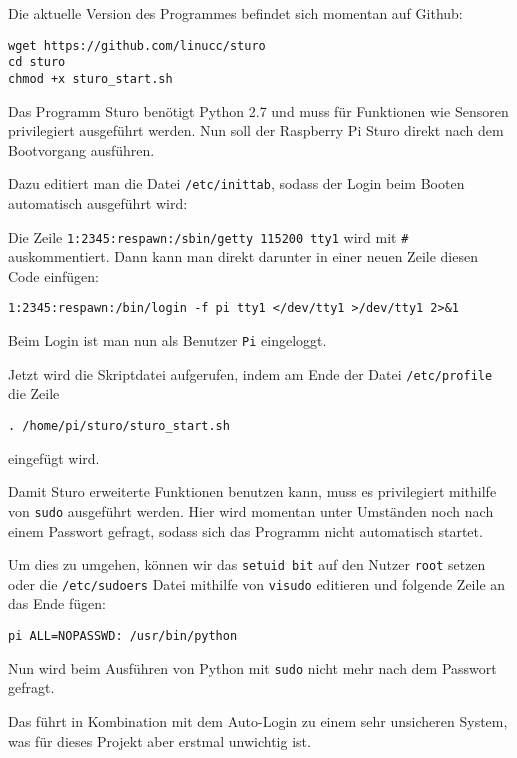 \documentclass[a4paper,10pt]{scrartcl}
\begin{document}
    Die aktuelle Version des Programmes befindet sich momentan auf Github:

    \begin{lstlisting}
wget https://github.com/linucc/sturo
cd sturo
chmod +x sturo_start.sh
    \end{lstlisting}

    Das Programm Sturo benötigt Python 2.7 und muss für Funktionen wie Sensoren privilegiert
    ausgeführt werden.
    Nun soll der Raspberry Pi Sturo direkt nach dem Bootvorgang ausführen.

    Dazu editiert man die Datei \lstinline{/etc/inittab}, sodass der Login beim Booten automatisch
    ausgeführt wird:

    Die Zeile \lstinline{1:2345:respawn:/sbin/getty 115200 tty1} wird mit \lstinline{#}
    auskommentiert.
    Dann kann man direkt darunter in einer neuen Zeile diesen Code einfügen:
    \begin{lstlisting}
1:2345:respawn:/bin/login -f pi tty1 </dev/tty1 >/dev/tty1 2>&1
    \end{lstlisting}
    Beim Login ist man nun als Benutzer \lstinline{Pi} eingeloggt.\cite{opentech}

    Jetzt wird die Skriptdatei aufgerufen, indem am Ende der Datei \lstinline{/etc/profile} die
    Zeile
    \begin{lstlisting}
. /home/pi/sturo/sturo_start.sh
    \end{lstlisting}
    eingefügt wird.

    Damit Sturo erweiterte Funktionen benutzen kann, muss es privilegiert mithilfe von
    \lstinline{sudo} ausgeführt werden.
    Hier wird momentan unter Umständen noch nach einem Passwort gefragt, sodass sich das Programm
    nicht automatisch startet.

    Um dies zu umgehen, können wir das \lstinline{setuid bit} auf den Nutzer \lstinline{root} setzen
    oder die \lstinline{/etc/sudoers} Datei mithilfe von \lstinline{visudo} editieren und folgende
    Zeile an das Ende fügen:
    \begin{lstlisting}
pi ALL=NOPASSWD: /usr/bin/python
    \end{lstlisting}

    Nun wird beim Ausführen von Python mit \lstinline{sudo} nicht mehr nach dem Passwort gefragt.

    Das führt in Kombination mit dem Auto-Login zu einem sehr unsicheren System, was für dieses
    Projekt aber erstmal unwichtig ist.
\end{document}
